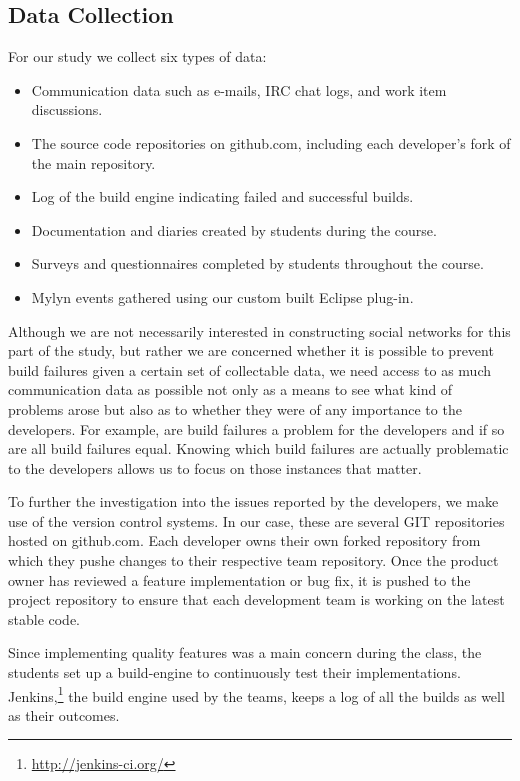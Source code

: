 \subsection{Data Collection}
For our study we collect six types of data:
\begin{itemize}
\item Communication data such as e-mails, IRC chat logs, and work item discussions.
\item The source code repositories on github.com, including each developer's fork of the main repository.
\item Log of the build engine indicating failed and successful builds.
\item Documentation and diaries created by students during the course.
\item Surveys and questionnaires completed by students throughout the course. 
\item Mylyn events gathered using our custom built Eclipse plug-in.
\end{itemize}

Although we are not necessarily interested in constructing social networks for this part of the study, but rather we are concerned whether it is possible to prevent build failures given a certain set of collectable data, we need access to as much communication data as possible not only as a means to see what kind of problems arose but also as to whether they were of any importance to the developers.
%
For example, are build failures a problem for the developers and if so are all build failures equal.
Knowing which build failures are actually problematic to the developers allows us to focus on those instances that matter.

To further the investigation into the issues reported by the developers, we make use of the version control systems.
In our case, these are several GIT repositories hosted on github.com.
Each developer owns their own forked repository from which they pushe changes to their respective team repository.
Once the product owner has reviewed a feature implementation or bug fix, it is pushed to the project repository to ensure that each development team is working on the latest stable code.

Since implementing quality features was a main concern during the class, the students set up a build-engine to continuously test their implementations.
Jenkins,\footnote{\url{http://jenkins-ci.org/}} the build engine used by the teams, keeps a log of all the builds as well as their outcomes.

